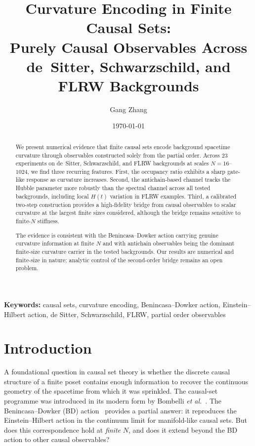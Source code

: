 \documentclass[12pt,a4paper]{article}
\title{Curvature Encoding in Finite Causal Sets:\\
  Purely Causal Observables Across de~Sitter, Schwarzschild, and FLRW Backgrounds}
\author{Gang Zhang}
\date{\today}
\begin{document}
\maketitle

\begin{abstract}
We present numerical evidence that finite causal sets encode background
spacetime curvature through observables constructed solely from the partial
order. Across 23 experiments on de~Sitter, Schwarzschild, and FLRW backgrounds
at scales $N=16$--$1024$, we find three recurring features. First, the
occupancy ratio exhibits a sharp gate-like response as curvature increases.
Second, the antichain-based channel tracks the Hubble parameter more robustly
than the spectral channel across all tested backgrounds, including local
$H(t)$ variation in FLRW examples. Third, a calibrated two-step construction
provides a high-fidelity bridge from causal observables to scalar curvature at
the largest finite sizes considered, although the bridge remains sensitive to
finite-$N$ stiffness.

The evidence is consistent with the Benincasa--Dowker action carrying genuine
curvature information at finite $N$ and with antichain observables being the
dominant finite-size curvature carrier in the tested backgrounds. Our results
are numerical and finite-size in nature; analytic control of the second-order
bridge remains an open problem.
\end{abstract}

\noindent\textbf{Keywords:}
causal sets, curvature encoding, Benincasa--Dowker action, Einstein--Hilbert
action, de Sitter, Schwarzschild, FLRW, partial order observables

\section{Introduction}

A foundational question in causal set theory is whether the discrete causal
structure of a finite poset contains enough information to recover the
continuous geometry of the spacetime from which it was sprinkled.
The causal-set programme was introduced in its modern form by
Bombelli \emph{et al.}~\cite{Bombelli1987}.
The Benincasa--Dowker (BD) action~\cite{BenincasaDowker2010} provides a
partial answer: it reproduces the Einstein--Hilbert action in the continuum
limit for manifold-like causal sets.
But does this correspondence hold at \emph{finite} $N$, and does it extend
beyond the BD action to other causal observables?
\end{document}
